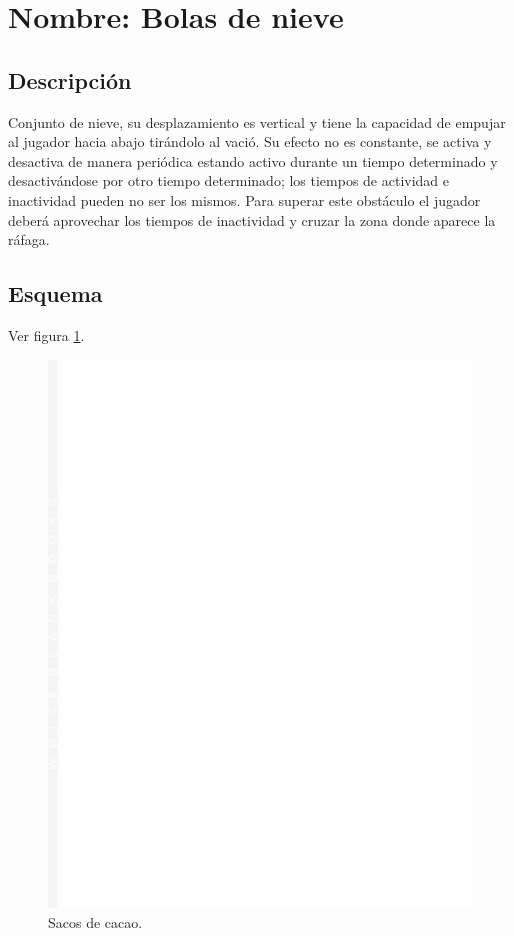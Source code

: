 		\section{Nombre: Bolas de nieve}\label{obs.bolasN}
	\subsection{Descripción}
	Conjunto de nieve, su desplazamiento es vertical y tiene la capacidad de empujar al jugador hacia abajo tirándolo al vació. Su efecto no es constante, se activa y desactiva de manera periódica estando activo durante un tiempo determinado y desactivándose por otro tiempo determinado; los tiempos de actividad e inactividad pueden no ser los mismos. Para superar este obstáculo el jugador deberá aprovechar los tiempos de inactividad y cruzar la zona donde aparece la ráfaga.
	\subsection{Esquema}
	Ver figura \ref{fig:bolasN}.
	\begin{figure}
		\centering
		\includegraphics[height=0.2 \textheight]{Imagenes/bolasN}
		\caption{Sacos de cacao.}
		\label{fig:bolasN}
	\end{figure}